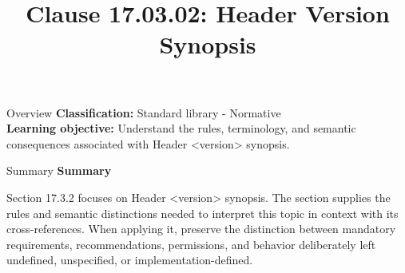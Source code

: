 \documentclass[10pt,letterpaper]{article}
\title{Clause 17.03.02: Header Version Synopsis}
\author{}
\date{}
\begin{document}
\maketitle
\begin{CornellOverviewBox}{Overview}
\textbf{Classification:} Standard library - Normative\\[2pt]
\textbf{Learning objective:} Understand the rules, terminology, and semantic consequences associated with Header <version> synopsis.
\end{CornellOverviewBox}\begin{CornellSummaryBox}{Summary}
{\sffamily\bfseries\color{Accent} Summary}\par\vspace{3pt}Section 17.3.2 focuses on Header <version> synopsis. The section supplies the rules and semantic distinctions needed to interpret this topic in context with its cross-references. When applying it, preserve the distinction between mandatory requirements, recommendations, permissions, and behavior deliberately left undefined, unspecified, or implementation-defined.
\end{CornellSummaryBox}
\end{document}
